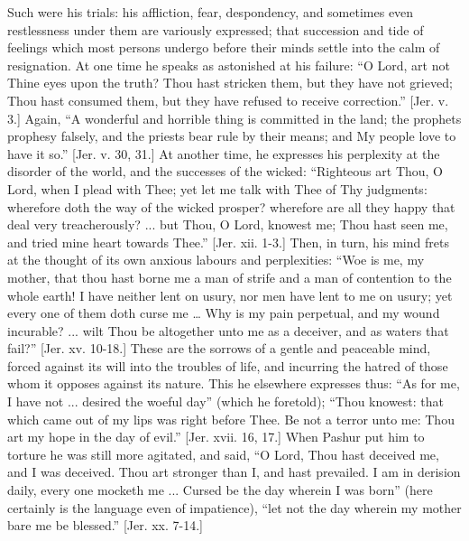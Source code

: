 Such were his trials: his affliction, fear, despondency, and
sometimes even restlessness under them are variously expressed; that
succession and tide of feelings which most persons undergo before
their minds settle into the calm of resignation. At one time he speaks
as astonished at his failure: ``O Lord, art not Thine eyes upon
the truth? Thou hast stricken them, but they have not grieved; Thou
hast consumed them, but they have refused to receive correction.''
[Jer. v. 3.] Again, ``A wonderful and horrible thing is committed
in the land; the prophets prophesy falsely, and the priests bear rule
by their means; and My people love to have it so.'' [Jer. v. 30,
31.] At another time, he expresses his perplexity at the disorder of the
world, and the successes of the wicked: ``Righteous art Thou, O
Lord, when I plead with Thee; yet let me talk with Thee of Thy
judgments: wherefore doth the way of the wicked prosper? wherefore are
all they happy that deal very treacherously? ... but Thou, O Lord,
knowest me; Thou hast seen me, and tried mine heart towards
Thee.'' [Jer. xii. 1-3.] Then, in turn, his mind frets at the
thought of its own anxious labours and perplexities: ``Woe is me,
my mother, that thou hast borne me a man of strife and a man of
contention to the whole earth! I have neither lent on usury, nor men
have lent to me on usury; yet every one of them doth curse me … Why
is my pain perpetual, and my wound incurable? ... wilt Thou be
altogether unto me as a deceiver, and as waters that fail?'' [Jer.
xv. 10-18.] These are the sorrows of a gentle and peaceable mind,
forced against its will into the troubles of life, and incurring the
hatred of those whom it opposes against its nature. This he elsewhere
expresses thus: ``As for me, I have not ... desired the woeful
day'' (which he foretold); ``Thou knowest: that which came out
of my lips was right before Thee. Be not a terror unto me: Thou art my
hope in the day of evil.'' [Jer. xvii. 16, 17.] When Pashur put
him to torture he was still more agitated, and said, ``O Lord,
Thou hast deceived me, and I was deceived. Thou art stronger than I,
and hast prevailed. I am in derision daily, every one mocketh me ...
Cursed be the day wherein I was born'' (here certainly is the
language even of impatience), ``let not the day wherein my mother
bare me be blessed.'' [Jer. xx. 7-14.]

